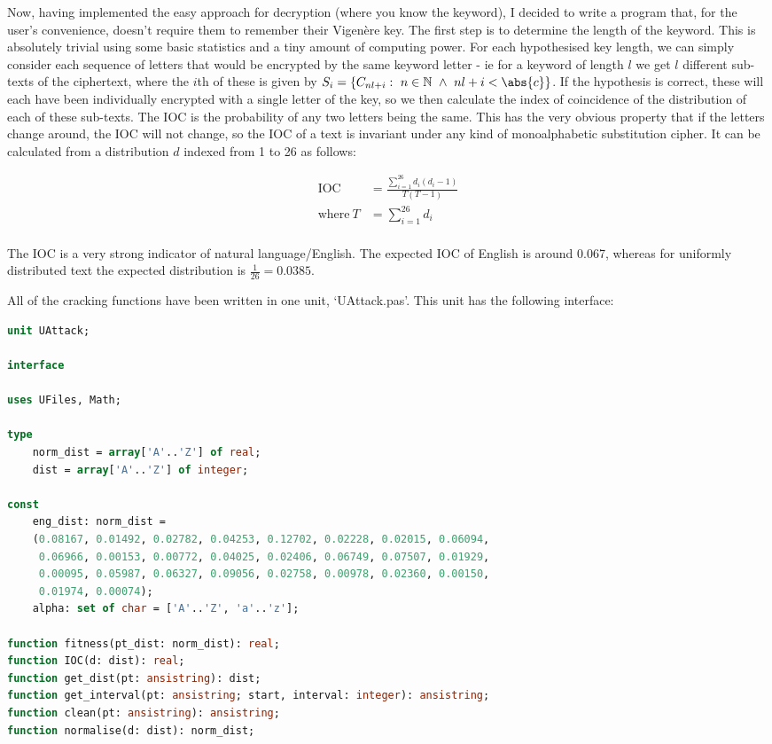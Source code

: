 \documentclass[fleqn,a4paper,11pt]{article}
\begin{document}
    Now, having implemented the easy approach for decryption (where you know the
    keyword), I decided to write a program that, for the user's convenience,
    doesn't require them to remember their Vigen\`ere key. The first step is to
    determine the length of the keyword. This is absolutely trivial using some
    basic statistics and a tiny amount of computing power. For each hypothesised
    key length, we can simply consider each sequence of letters that would be
    encrypted by the same keyword letter - ie for a keyword of length \(l\) we
    get \(l\) different sub-texts of the ciphertext, where the \(i\)th of these
    is given by \(S_i = \{C_{nl + i}:\ n \in \mathbb{N} \ \land\ nl + i <
    \abs{c}\}\). If the hypothesis is correct, these will each have been
    individually encrypted with a single letter of the key, so  we then
    calculate the index of coincidence of the distribution of each of these
    sub-texts. The IOC is the probability of any two letters being the same.
    This has the very obvious property that if the letters change around, the
    IOC will not change, so the IOC of a text is invariant under any kind of
    monoalphabetic substitution cipher. It can be calculated from a distribution
    \(d\) indexed from 1 to 26 as follows:

\begin{align*}
    \text{IOC}\ &= \frac{\sum\limits_{i = 1}^{26} d_i (d_i - 1)}{T (T - 1)}\\
    \text{where}\ T &= \sum\limits_{i = 1}^{26} d_i\\
\end{align*}

    The IOC is a very strong indicator of natural language/English. The
    expected IOC of English is around 0.067, whereas for uniformly distributed
    text the expected distribution is \(\frac{1}{26} = 0.0385\).

    All of the cracking functions have been written in one unit, `UAttack.pas'.
    This unit has the following interface:

\begin{lstlisting}[language=Pascal, caption=UAttack interface]
unit UAttack;

interface

uses UFiles, Math;

type
    norm_dist = array['A'..'Z'] of real;
    dist = array['A'..'Z'] of integer;

const
    eng_dist: norm_dist =
    (0.08167, 0.01492, 0.02782, 0.04253, 0.12702, 0.02228, 0.02015, 0.06094,
     0.06966, 0.00153, 0.00772, 0.04025, 0.02406, 0.06749, 0.07507, 0.01929,
     0.00095, 0.05987, 0.06327, 0.09056, 0.02758, 0.00978, 0.02360, 0.00150,
     0.01974, 0.00074);
    alpha: set of char = ['A'..'Z', 'a'..'z'];

function fitness(pt_dist: norm_dist): real;
function IOC(d: dist): real;
function get_dist(pt: ansistring): dist;
function get_interval(pt: ansistring; start, interval: integer): ansistring;
function clean(pt: ansistring): ansistring;
function normalise(d: dist): norm_dist;
\end{lstlisting}
\end{document}

